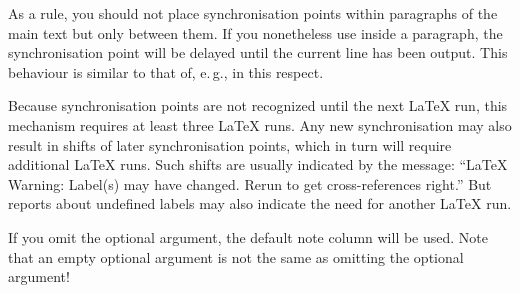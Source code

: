 As a rule, you should not place synchronisation points within
paragraphs of the main text but only between them. If you nonetheless use
 inside a paragraph, the synchronisation point will
be delayed until the current line has been output. This behaviour is similar
to that of, e.\,g.,  in this respect.

Because synchronisation points are not recognized until the next \LaTeX{}
run, this mechanism requires at least three
\LaTeX{} runs. Any new synchronisation may also result in shifts of later
synchronisation points, which in turn will require additional \LaTeX{} runs.
Such shifts are usually indicated by the message: ``\LaTeX{} Warning: Label(s)
may have changed. Rerun to get cross-references right.'' But reports about
undefined labels may also indicate the need for another \LaTeX{} run.

If you omit the optional argument, the default note column 
will be used. Note that an empty optional argument is not
the same as omitting the optional argument!

